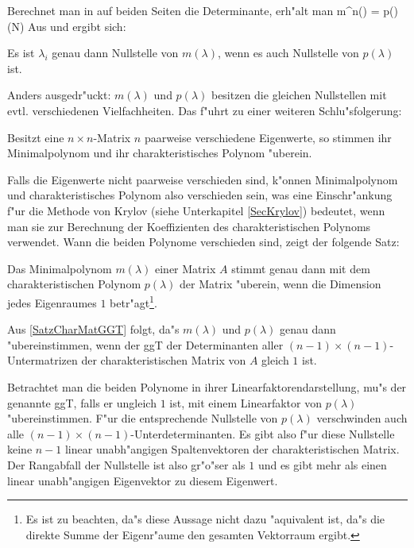 Berechnet man in  auf beiden Seiten die Determinante,
erh"alt man
   m^n(\lambda) = p(\lambda) \det(N) \MyPunkt
\Eeq
Aus  und  ergibt sich:

\begin{korollar}
\label{SatzMinimalNullGenauDann}
    Es ist $\lambda_i$ genau dann Nullstelle von $m(\lambda)$, wenn es auch
    Nullstelle von $p(\lambda)$ ist.
\end{korollar}

Anders ausgedr"uckt: $m(\lambda)$ und $p(\lambda)$ besitzen die gleichen
Nullstellen mit evtl. verschiedenen Vielfachheiten. Das f"uhrt
zu einer weiteren Schlu"sfolgerung:

\begin{korollar}
\label{SatzPaarweiseVerschieden}
    Besitzt eine $n \times n$-Matrix $n$ paarweise verschiedene Eigenwerte,
    so stimmen ihr Minimalpolynom und ihr charakteristisches Polynom
    "uberein.
\end{korollar}

Falls die Eigenwerte nicht paarweise verschieden sind, k"onnen 
Minimalpolynom und charakteristisches Polynom also verschieden sein, was
eine Einschr"ankung f"ur die Methode von Krylov 
(siehe Unterkapitel \ref{SecKrylov}) bedeutet, wenn man sie zur Berechnung
der Koeffizienten des charakteristischen Polynoms verwendet.
Wann die beiden Polynome verschieden sind, zeigt der folgende Satz:

\begin{satz}
\label{SatzMinimalDimEins}
    Das Minimalpolynom $m(\lambda)$ einer Matrix $A$ stimmt genau dann 
    mit dem charakteristischen Polynom $p(\lambda)$ der Matrix "uberein, 
    wenn die Dimension jedes Eigenraumes $1$ 
    betr"agt\footnote{Es ist zu beachten, da"s diese Aussage nicht dazu 
    "aquivalent ist, da"s die direkte Summe der Eigenr"aume den gesamten 
    Vektorraum ergibt.}.
\end{satz}
\begin{beweis}
    Aus \ref{SatzCharMatGGT} folgt, da"s $m(\lambda)$ und $p(\lambda)$
    genau dann "ubereinstimmen, wenn der 
    ggT der Determinanten aller $(n-1) \times (n-1)$-Untermatrizen
    der charakteristischen Matrix von $A$ gleich $1$ ist.
    
    Betrachtet man die beiden Polynome in ihrer Linearfaktorendarstellung,
    mu"s der genannte ggT, falls er ungleich $1$ ist, mit einem Linearfaktor
    von $p(\lambda)$ "ubereinstimmen. F"ur die entsprechende Nullstelle
    von $p(\lambda)$ verschwinden auch alle 
    $(n-1) \times (n-1)$-Unterdeterminanten. Es gibt also f"ur diese
    Nullstelle keine $n-1$ linear unabh"angigen Spaltenvektoren der 
    charakteristischen Matrix. Der Rangabfall der Nullstelle ist also
    gr"o"ser als $1$ und es gibt mehr als einen linear unabh"angigen 
    Eigenvektor zu diesem Eigenwert.
\end{beweis}

